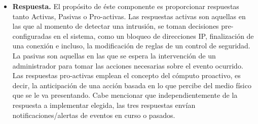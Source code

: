 \begin{itemize}
	\item \textbf{Respuesta.} El propósito de éste componente es proporcionar respuestas tanto Activas, Pasivas o Pro-activas. Las respuestas activas son aquellas en las que al momento de detectar una intrusión, se toman decisiones pre-configuradas en el sistema, como un bloqueo de direcciones IP, finalización de una conexión e incluso, la modificación de reglas de un control de seguridad. La pasivas son aquellas en las que se espera la intervención de un administrador para tomar las acciones necesarias sobre el evento ocurrido. Las respuestas pro-activas emplean el concepto del cómputo proactivo, es decir, la anticipación de una acción basada en lo que percibe del medio físico que se le va presentando. Cabe mencionar que independientemente de la respuesta a implementar elegida, las tres respuestas envían notificaciones/alertas de eventos en curso o pasados.\\
	
\end{itemize}